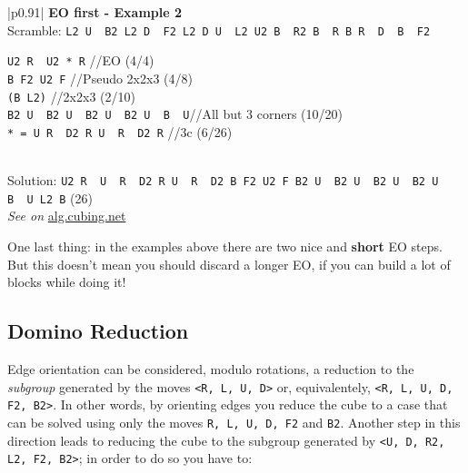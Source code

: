 \documentclass[11pt,a4paper]{book}
\newcommand{\p}{\textquotesingle}
\newcommand{\m}{\texttt}
\newcommand{\ps}{\p\,\,}
\newcommand{\comment}[1]{{\color{gray}\quad//#1}}
\begin{document}
\bigskip
\begin{tabular}{|p{}|}
\hline
\textbf{EO first - Example 2}\\
\hline
Scramble: \m{L2 U\ps B2 L2 D\ps F2 L2 D U\ps L2 U2 B\ps R2 B\ps R B R\ps D\ps B\ps F2}\\
\hline
\begin{minipage}[l]{0.650\textwidth}
\m{U2 R\ps U2 * R\p} \comment{EO (4/4)}\\
\m{B F2 U2 F} \comment{Pseudo 2x2x3 (4/8)}\\
\m{(B L2)} \comment{2x2x3 (2/10)}\\
\m{B2 U\ps B2 U\ps B2 U\ps B2 U\ps B\ps U}\comment{All but 3 corners (10/20)}\\
\m{* = U R\ps D2 R U\ps R\ps D2 R} \comment{3c (6/26)}
\end{minipage}
\begin{minipage}[c]{0.25\textwidth}

\end{minipage}\\
\hline
Solution: \m{U2 R\ps U\ps R\ps D2 R U\ps R\ps D2 B F2 U2 F B2 U\ps B2 U\ps B2 U\ps B2 U\ps B\ps U L2 B\p} (26)\\
\hline
\emph{See on }\href{https://alg.cubing.net/?setup=L2_B-_L2_U-_B2_L2_D-_F2_L2_D_U-_L2_U2_B-_R2_B-_R_B_R-_D-_B-_F2&alg=\%2F\%2FPremoves_(NISS)_added_to_the_scramble\%0AU2_R-_U2_(U_R-_D2_R_U-_R-_D2_R)_R-_\%2F\%2FEO\%0AB_F2_U2_F_\%2F\%2F2x2x3\%0AB2_U-_B2_U-_B2_U-_B2_U-_B-_U_\%2F\%2FAll_but_3_corners}{alg.cubing.net}\\
\hline
\end{tabular}
\bigskip


One last thing: in the examples above there are two nice and \textbf{short} EO steps. But this doesn't mean you should discard a longer EO, if you can build a lot of blocks while doing it!


\subsection{Domino Reduction}
\label{subsection:eoToDR}

Edge orientation can be considered, modulo rotations, a reduction to the \emph{subgroup} generated by the moves \m{<R, L, U, D>} or, equivalentely, \m{<R, L, U, D, F2, B2>}. In other words, by orienting edges you reduce the cube to a case that can be solved using only the moves \m{R, L, U, D, F2} and \m{B2}. Another step in this direction leads to reducing the cube to the subgroup generated by \m{<U, D, R2, L2, F2, B2>}; in order to do so you have to:
\end{document}
